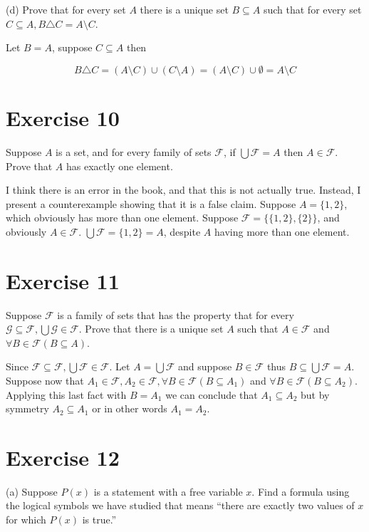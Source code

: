 \documentclass[11pt]{article}
\newcommand{\family}[1]{\mathcal{#1}}
\begin{document}
\noindent (d) Prove that for every set $A$ there is a unique set $B \subseteq A$
such that for every set $C \subseteq A, B \triangle C = A \setminus C$.

Let $B = A$, suppose $C \subseteq A$ then

$$B \triangle C = 
(A \setminus C) \cup (C \setminus A) =
(A \setminus C) \cup \emptyset = 
A \setminus C$$

\section*{Exercise 10}

Suppose $A$ is a set, and for every family of sets $\family{F}$, if 
$\bigcup \family{F} = A$ then $A \in \family{F}$. Prove that $A$ has exactly one 
element.

I think there is an error in the book, and that this is not actually true.
Instead, I present a counterexample showing that it is a false claim. 
Suppose $A = \{1,2\}$, which obviously has more than one element. Suppose 
$\family{F} = \{ \{1,2\}, \{2\} \}$, and obviously $A \in \family{F}$.
$\bigcup \family{F} = \{1,2\} = A$, despite $A$ having more than one element.

\section*{Exercise 11}

Suppose $\family{F}$ is a family of sets that has the property that for every 
$\family{G} \subseteq \family{F}, \bigcup \family{G} \in \family{F}$. Prove that 
there is a unique set $A$ such that $A \in \family{F}$ and 
$\forall B \in \family{F} (B \subseteq A)$.

Since $\family{F} \subseteq \family{F}, \bigcup \family{F} \in \family{F}$. 
Let $A = \bigcup \family{F}$ and suppose $B \in \family{F}$ thus 
$B \subseteq \bigcup \family{F} = A$. Suppose now that 
$A_1 \in \family{F}, A_2 \in \family{F}, \forall B \in \family{F} (B \subseteq A_1)$
and $\forall B \in \family{F} (B \subseteq A_2)$. Applying this last fact with 
$B = A_1$ we can conclude that $A_1 \subseteq A_2$ but by symmetry $A_2 \subseteq A_1$
or in other words $A_1 = A_2$.

\section*{Exercise 12}

\noindent (a) Suppose $P(x)$ is a statement with a free variable $x$. Find a formula using 
the logical symbols we have studied that means ``there are exactly two values 
of $x$ for which $P(x)$ is true.''
\end{document}
